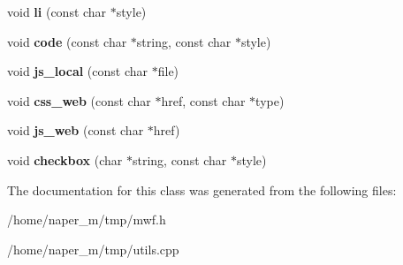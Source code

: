 \begin{DoxyCompactItemize}
\item 
\hypertarget{class_mw_1_1_html_a614a71477965efa7255582fef4b2c785}{void {\bfseries li} (const char $\ast$style)}\label{class_mw_1_1_html_a614a71477965efa7255582fef4b2c785}

\item 
\hypertarget{class_mw_1_1_html_affec6c83b8f0d8282b2957084184325a}{void {\bfseries code} (const char $\ast$string, const char $\ast$style)}\label{class_mw_1_1_html_affec6c83b8f0d8282b2957084184325a}

\item 
\hypertarget{class_mw_1_1_html_aef3c54c0fa97e381d46cc281342cfc3e}{void {\bfseries js\-\_\-local} (const char $\ast$file)}\label{class_mw_1_1_html_aef3c54c0fa97e381d46cc281342cfc3e}

\item 
\hypertarget{class_mw_1_1_html_a22301e5d62f1e151b19d148e547b655d}{void {\bfseries css\-\_\-web} (const char $\ast$href, const char $\ast$type)}\label{class_mw_1_1_html_a22301e5d62f1e151b19d148e547b655d}

\item 
\hypertarget{class_mw_1_1_html_a0c4f0b2408c5b1cc6752ee72d2e7d7c6}{void {\bfseries js\-\_\-web} (const char $\ast$href)}\label{class_mw_1_1_html_a0c4f0b2408c5b1cc6752ee72d2e7d7c6}

\item 
\hypertarget{class_mw_1_1_html_ab6410a98848038b702c2c4b32053abb8}{void {\bfseries checkbox} (char $\ast$string, const char $\ast$style)}\label{class_mw_1_1_html_ab6410a98848038b702c2c4b32053abb8}

\end{DoxyCompactItemize}


The documentation for this class was generated from the following files\-:\begin{DoxyCompactItemize}
\item 
/home/naper\-\_\-m/tmp/mwf.\-h\item 
/home/naper\-\_\-m/tmp/utils.\-cpp\end{DoxyCompactItemize}
